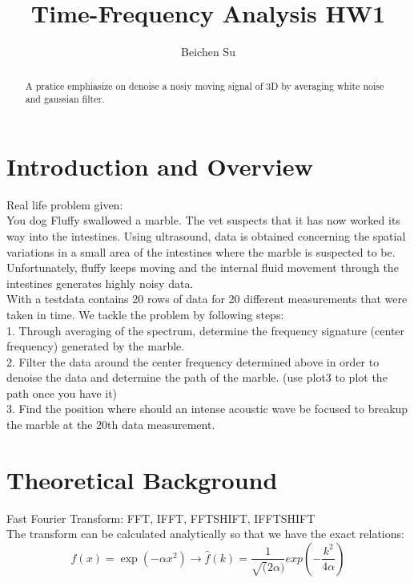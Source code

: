 \documentclass[12pt,letterpaper]{article}
\begin{document}
\title{Time-Frequency Analysis HW1}
\author{Beichen Su}

\maketitle

\begin{abstract}
A pratice emphiasize on denoise a nosiy moving signal of 3D by averaging white noise and gaussian filter.
\end{abstract}

\newpage
\section{Introduction and Overview}
Real life problem given:\\
You dog Fluffy swallowed a marble. The vet suspects that it has now worked its way into the intestines.
Using ultrasound, data is obtained concerning the spatial variations in a small area of the intestines where the
marble is suspected to be. Unfortunately, fluffy keeps moving and the internal fluid movement through the
intestines generates highly noisy data.\\
With a testdata contains 20 rows of data for 20 different measurements that were taken in time.
We tackle the problem by following steps:\\
1. Through averaging of the spectrum, determine the frequency signature (center frequency) generated by
the marble.\\
2. Filter the data around the center frequency determined above in order to denoise the data and determine
the path of the marble. (use plot3 to plot the path once you have it)\\
3. Find the position where should an intense acoustic wave be focused to breakup the marble at the 20th data measurement.\\
\newline 




\section{Theoretical Background}

Fast Fourier Transform: FFT, IFFT, FFTSHIFT, IFFTSHIFT\\
The transform can be calculated analytically so that we have the exact relations:\\

\begin{equation}
    \label{Fourier Transform}
    f(x) = \exp{(-\alpha x ^2)}  \rightarrow  \hat{f}(k) = \frac{1}{\sqrt(2\alpha)}exp(-\frac{k^2}{4\alpha})
\end{equation}
\end{document}
